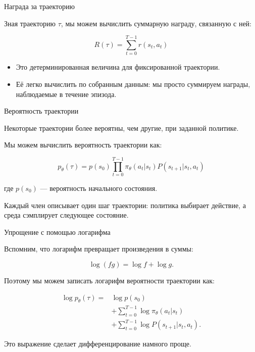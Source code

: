 \documentclass{beamer}
\begin{document}
	\begin{frame}{Награда за траекторию}
		\begin{flushleft}
			
			Зная траекторию $\tau$, мы можем вычислить
			суммарную награду, связанную с ней:
			
			\[
			\boxed{
				R(\tau)=\sum_{t=0}^{T-1}r(s_t,a_t)
			}
			\]
			
			\begin{itemize}
				\item Это детерминированная величина для фиксированной
				траектории.
				\item Её легко вычислить по собранным данным:
				мы просто суммируем награды, наблюдаемые в течение эпизода.
			\end{itemize}
			
		\end{flushleft}
	\end{frame}
	
	\begin{frame}{Вероятность траектории}
		\begin{flushleft}
			
			Некоторые траектории более вероятны, чем другие,
			при заданной политике.
			
			Мы можем вычислить вероятность траектории как:
			
			\[
			\boxed{
				p_\theta(\tau)
				=
				p(s_0)
				\prod_{t=0}^{T-1}
				\pi_\theta(a_t|s_t)
				P(s_{t+1}|s_t,a_t)
			}
			\]
			
			где $p(s_0)$ — вероятность начального состояния.
			
			Каждый член описывает один шаг траектории:
			политика выбирает действие, а среда
			сэмплирует следующее состояние.
			
		\end{flushleft}
	\end{frame}
	
	\begin{frame}{Упрощение с помощью логарифма}
		\begin{flushleft}
			
			Вспомним, что логарифм превращает произведения в суммы:
			
			\[
			\log(fg)=\log f+\log g.
			\]
			
			Поэтому мы можем записать логарифм вероятности траектории как:
			
			\[
			\boxed{
				\begin{aligned}
					\log p_\theta(\tau)
					={}&\log p(s_0)\\
					&+\sum_{t=0}^{T-1}\log\pi_\theta(a_t|s_t)\\
					&+\sum_{t=0}^{T-1}
					\log P(s_{t+1}|s_t,a_t).
				\end{aligned}
			}
			\]
			
			Это выражение сделает дифференцирование намного проще.
			
		\end{flushleft}
	\end{frame}
	
\end{document}
